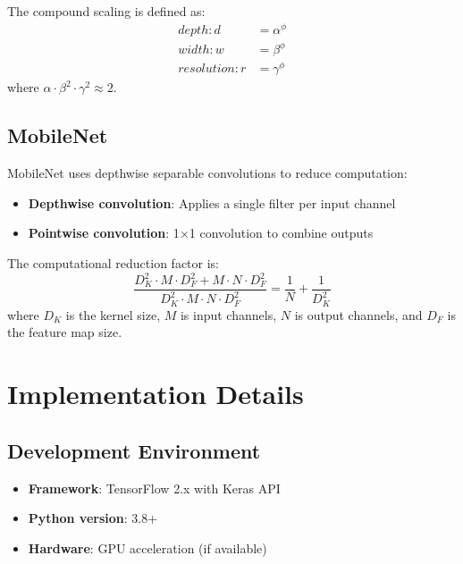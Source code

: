 \documentclass[12pt,a4paper]{article}
\begin{document}
The compound scaling is defined as:
\begin{align}
    depth: d &= \alpha^\phi \\
    width: w &= \beta^\phi \\
    resolution: r &= \gamma^\phi
\end{align}
where $\alpha \cdot \beta^2 \cdot \gamma^2 \approx 2$.

\subsection{MobileNet}

MobileNet \cite{mobilenet} uses depthwise separable convolutions to reduce computation:

\begin{itemize}
    \item \textbf{Depthwise convolution}: Applies a single filter per input channel
    \item \textbf{Pointwise convolution}: 1$\times$1 convolution to combine outputs
\end{itemize}

The computational reduction factor is:
\begin{equation}
    \frac{D_K^2 \cdot M \cdot D_F^2 + M \cdot N \cdot D_F^2}{D_K^2 \cdot M \cdot N \cdot D_F^2} = \frac{1}{N} + \frac{1}{D_K^2}
\end{equation}
where $D_K$ is the kernel size, $M$ is input channels, $N$ is output channels, and $D_F$ is the feature map size.

\section{Implementation Details}

\subsection{Development Environment}

\begin{itemize}
    \item \textbf{Framework}: TensorFlow 2.x with Keras API
    \item \textbf{Python version}: 3.8+
    \item \textbf{Hardware}: GPU acceleration (if available)
\end{itemize}
\end{document}
